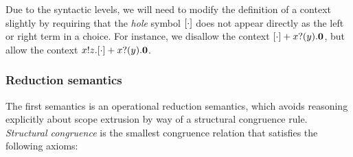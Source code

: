 


Due to the syntactic levels, we will need to modify the definition of a context slightly by requiring that the \emph{hole} symbol \( [\cdot] \) does not appear directly as the left or right term in a choice.
For instance, we disallow the context \( [\cdot] + x ? (y) . \bm{0} \), but allow the context \( x ! z . [\cdot] + x ? (y) . \bm{0} \).

\subsubsection{Reduction semantics}
The first semantics is an operational reduction semantics, which avoids reasoning explicitly about scope extrusion by way of a structural congruence rule.
\emph{Structural congruence} is the smallest congruence relation that satisfies the following axioms:

